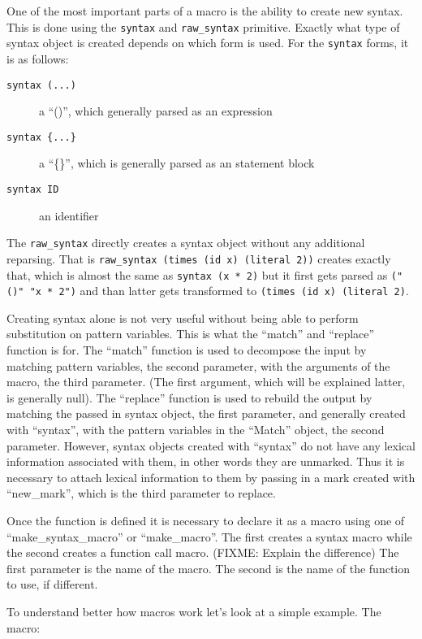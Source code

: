 \documentclass[12pt,english,letterpaper]{article}
\begin{document}
One of the most important parts of a macro is the ability to create new
syntax.  This is done using the \verb/syntax/ and \verb/raw_syntax/
primitive.  Exactly what type of syntax object is created depends on
which form is used.  For the \verb/syntax/ forms, it is as follows:
\begin{description}
\item[\texttt{syntax (...)}] a ``()'', which generally parsed as an expression
\item[\texttt{syntax \{...\}}] a ``\{\}'', which is generally parsed as an statement block
\item[\texttt{syntax ID}] an identifier
\end{description}
The \verb/raw_syntax/ directly creates a syntax object without any
additional reparsing.  That is
\verb/raw_syntax (times (id x) (literal 2))/ creates exactly that,
which is almost the same as \verb/syntax (x * 2)/ but it first gets
parsed as \verb/("()" "x * 2")/ and than latter gets transformed to
\verb/(times (id x) (literal 2)/.

Creating syntax alone is not very useful without being able to perform
substitution on pattern variables.  This is what the ``match'' and
``replace'' function is for.  The ``match'' function is used to
decompose the input by matching pattern variables, the second
parameter, with the arguments of the macro, the third
parameter.  (The first argument, which will be explained latter, is
generally null).  The ``replace'' function is used to rebuild the
output by matching the passed in syntax object, the first parameter,
and generally created with ``syntax'', with the pattern variables
in the ``Match'' object, the second parameter.  However, syntax
objects created with ``syntax'' do not have any lexical information
associated with them, in other words they are unmarked.  Thus it is
necessary to attach lexical information to them by passing in a mark
created with ``new\_mark'', which is the third parameter to replace.

Once the function is defined it is necessary to declare it as a macro
using one of ``make\_syntax\_macro'' or ``make\_macro''.  The first creates a
syntax macro while the second creates a function call macro. (FIXME:
Explain the difference) The first parameter is the name of the macro.
The second is the name of the function to use, if different.


To understand better how macros work let's look at a simple example.
The macro:
\end{document}
